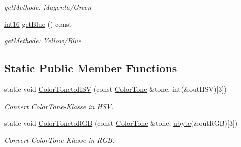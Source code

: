 \begin{DoxyCompactItemize}
\begin{DoxyCompactList}\small\item\em getMethode: Magenta/Green \item\end{DoxyCompactList}\item 
\hypertarget{class_f2_c_1_1_color_tone_a2e9e07d9fc2d3c7ac8e880ccee337d4e}{
\hyperlink{namespace_f2_c_ab83c1e14d784a7d520d770ca6fa8fd8e}{int16} \hyperlink{class_f2_c_1_1_color_tone_a2e9e07d9fc2d3c7ac8e880ccee337d4e}{getBlue} () const }
\label{class_f2_c_1_1_color_tone_a2e9e07d9fc2d3c7ac8e880ccee337d4e}

\begin{DoxyCompactList}\small\item\em getMethode: Yellow/Blue \item\end{DoxyCompactList}\end{DoxyCompactItemize}
\subsection*{Static Public Member Functions}
\begin{DoxyCompactItemize}
\item 
static void \hyperlink{class_f2_c_1_1_color_tone_a888395ee1133ec4e44683d571f719ab0}{ColorTonetoHSV} (const \hyperlink{class_f2_c_1_1_color_tone}{ColorTone} \&tone, int(\&outHSV)\mbox{[}3\mbox{]})
\begin{DoxyCompactList}\small\item\em Convert ColorTone-\/Klasse in HSV. \item\end{DoxyCompactList}\item 
static void \hyperlink{class_f2_c_1_1_color_tone_a55e96167a3106b92bfa8b28bb098b2bc}{ColorTonetoRGB} (const \hyperlink{class_f2_c_1_1_color_tone}{ColorTone} \&tone, \hyperlink{namespace_f2_c_a74fad364688add30796d711e5635ac77}{ubyte}(\&outRGB)\mbox{[}3\mbox{]})
\begin{DoxyCompactList}\small\item\em Convert ColorTone-\/Klasse in RGB. \item\end{DoxyCompactList}\end{DoxyCompactItemize}
